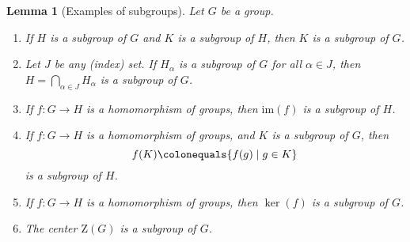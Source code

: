 \documentclass[12pt]{report}
\newtheorem{lemma}[theorem]{Lemma}
\numberwithin{equation}{section}
\numberwithin{theorem}{chapter}
\theoremstyle{definition}
\newtheorem*{basic properties}{Basic Properties}
\newtheorem*{Important Remark}{Important Remark}
\renewcommand{\ker}{\operatorname{ker}}
\begin{document}
\begin{lemma}[Examples of subgroups]\label{subgroups examples}
Let $G$ be a group.
\vspace{-0.3em}
\begin{enumerate}[leftmargin=20pt,itemsep=-0.1em,label=(\alph*)]
\item If $H$ is a subgroup of $G$ and $K$ is a subgroup of $H$, then $K$ is a subgroup of $G$. 
\item Let $J$ be any (index) set. If $H_\alpha$ is a subgroup of $G$ for all $\alpha \in J$, then $H=\bigcap_{\alpha\in J} H_\alpha$ is a subgroup of $G$.
 \item If $f: G \to H$ is a homomorphism of groups, then $\mathrm{im}(f)$ is a subgroup of $H$.
 \item If $f: G \to H$ is a homomorphism of groups, and $K$ is a subgroup of $G$, then 
 $$f(K) \colonequals \{ f(g) \mid g \in K \}$$
is a subgroup of $H$.
 \item If $f: G \to H$ is a homomorphism of groups, then $\ker(f)$ is a subgroup of $G$.
 \item The center $\mathrm{Z}(G)$ is a subgroup of $G$.
\end{enumerate}
\end{lemma}
\end{document}
